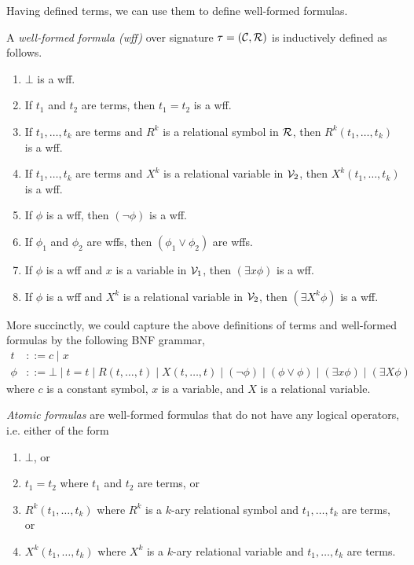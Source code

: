\documentclass[11pt,twoside=off,numbers=noenddot]{scrbook}
\begin{document}
Having defined terms, we can use them to define well-formed formulas.

\begin{definition}
  A \emph{well-formed formula (wff)} over signature $\tau = (\mathcal{C},
  \mathcal{R})$ is inductively defined as follows.
  \begin{enumerate}
    \item $\bot$ is a wff.
    \item If $t_1$ and $t_2$ are terms, then $t_1 = t_2$ is a wff.
    \item If $t_1, \dots, t_k$ are terms and $R^k$ is a relational
      symbol in $\mathcal{R}$, then $R^k(t_1, \dots, t_k)$ is a wff.
    \item If $t_1, \dots, t_k$ are terms and $X^k$ is a relational
      variable in $\mathcal{V}_2$, then $X^k(t_1, \dots, t_k)$ is a wff.
    \item If $\phi$ is a wff, then $(\neg \phi)$ is a wff.
    \item If $\phi_1$ and $\phi_2$ are wffs, then $(\phi_1 \vee
      \phi_2)$ are wffs.
    \item If $\phi$ is a wff and $x$ is a variable in $\mathcal{V}_1$, then
      $(\exists x \phi)$ is a wff.
    \item If $\phi$ is a wff and $X^k$ is a relational variable in
      $\mathcal{V}_2$, then $(\exists X^k \phi)$ is a wff.
  \end{enumerate}
\end{definition}

More succinctly, we could capture the above definitions of terms and
well-formed formulas by the following BNF grammar,
\begin{align*}
  t & ::= c \mid x \\
  \phi & ::= \bot \mid t = t \mid R(t, \dots, t) \mid X(t, \dots, t)
  \mid (\neg \phi) \mid (\phi \vee \phi) \mid (\exists x \phi) \mid
  (\exists X \phi)
\end{align*}
where $c$ is a constant symbol, $x$ is a variable, and $X$ is a
relational variable.

\emph{Atomic formulas} are well-formed formulas that do not have any
logical operators, i.e. either of the form
\begin{enumerate}
  \item $\bot$, or
  \item $t_1 = t_2$ where $t_1$ and $t_2$ are terms, or
  \item $R^k(t_1, \dots, t_k)$ where $R^k$ is a $k$-ary relational
    symbol and $t_1, \dots, t_k$ are terms, or
  \item $X^k(t_1, \dots, t_k)$ where $X^k$ is a $k$-ary relational
    variable and $t_1, \dots, t_k$ are terms.
\end{enumerate}
\end{document}
